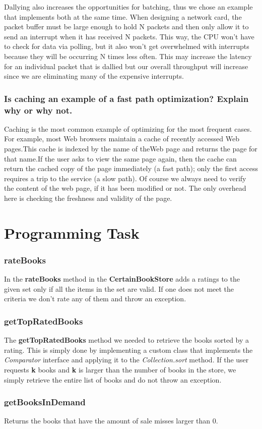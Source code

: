 \documentclass{article}      %
\begin{document}
Dallying also increases the opportunities for batching, thus we chose an example that implements both at the same time. When designing a network card, the packet buffer must be large enough to hold N packets and then only allow it to send an interrupt when it has received N packets. This way, the CPU won't have to check for data via polling, but it also won't get overwhelmed with interrupts because they will be occurring N times less often. This may increase the latency for an individual packet that is dallied but our overall throughput will increase since we are eliminating many of the expensive interrupts.\\

\subsubsection{Is caching an example of a fast path optimization? Explain why or why not.}

Caching is the most common example of optimizing for the most frequent cases. For example, most Web browsers maintain a cache of recently accessed Web pages.This cache is indexed by the name of theWeb page and returns the page for that name.If the user asks to view the same page again, then the cache can return the cached copy of the page immediately (a fast path); only the first access requires a trip to the service (a slow path). Of course we always need to verify the content of the web page, if it has been modified or not. The only overhead here is checking the freshness and validity of the page.\\

\section*{Programming Task}

\subsubsection*{rateBooks}
In the {\bf rateBooks} method in the {\bf CertainBookStore} adds a ratings to the given set only if all the items in the set are valid. If one does not meet the criteria we don't rate any of them and throw an exception.\\
\subsubsection*{getTopRatedBooks}
The {\bf getTopRatedBooks} method we needed to retrieve the books sorted by a rating. This is simply done by implementing a custom class that implements the \emph{Comparator} interface and applying it  to the \emph{Collection.sort} method. If the user requests {\bf k} books and {\bf k} is larger than the number of books in the store, we simply retrieve the entire list of books and do not throw an exception.\\
\subsubsection*{getBooksInDemand}
Returns the books that have the amount of sale misses larger than 0.\\
\end{document}
